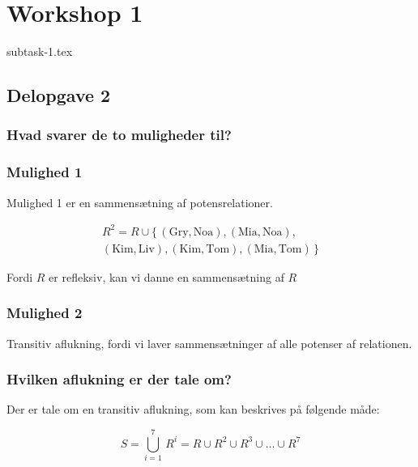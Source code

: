 \chapter{Workshop 1}\label{ch:workshop-1}

{subtask-1.tex}


\section{Delopgave 2}\label{sec:delopgave-2}

\subsection{Hvad svarer de to muligheder til?}\label{subsec:hvad-svarer-de-to-muligheder-til?}

\subsection*{Mulighed 1}

Mulighed 1 er en sammensætning af potensrelationer.

\begin{equation}
    \begin{split}
        R^2 = R \cup \{\,(\text{Gry}, \text{Noa}), (\text{Mia}, \text{Noa}), \\
        (\text{Kim}, \text{Liv}), (\text{Kim}, \text{Tom}), (\text{Mia}, \text{Tom})\,\}
    \end{split}\label{eq:equation7}
\end{equation}

Fordi \(R\) er refleksiv, kan vi danne en sammensætning af \(R\)

\subsection*{Mulighed 2}
Transitiv aflukning, fordi vi laver sammensætninger af alle potenser af relationen.

\subsection{Hvilken aflukning er der tale om?}\label{subsec:hvilken-aflukning-er-der-tale-om?}
Der er tale om en transitiv aflukning, som kan beskrives på følgende måde:

\begin{equation}
    S = \bigcup_{i=1}^{7} \, R^{i} = R \cup R^2 \cup R^3 \cup \ldots \cup R^7 \label{eq:equation6}
\end{equation}

